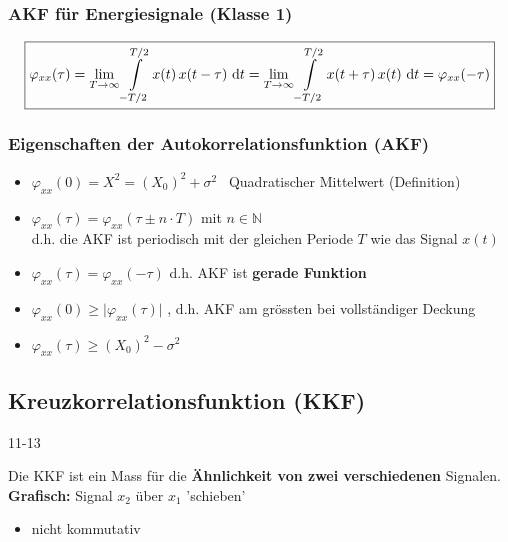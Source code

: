 \subsubsection{AKF für Energiesignale (Klasse 1)}

\vspace{-0.2cm}

$$ \boxed{ \varphi_{xx}(\tau) = \lim\limits_{T \to \infty}  \int\limits_{-T/2}^{T/2} x(t) \, x(t-\tau) \, \mathop{} \! \mathrm{d} t 
    =  \lim\limits_{T \to \infty}  \int\limits_{-T/2}^{T/2} x(t+\tau) \,x(t) \, \mathop{} \! \mathrm{d} t = \varphi_{xx}(-\tau) } $$


\subsubsection{Eigenschaften der Autokorrelationsfunktion (AKF)}

\begin{itemize}
    \setlength\itemsep{5pt}
    \item $\varphi_{xx}(0) = X^2 = (X_0)^2 + \sigma^2 $ \textrightarrow\ Quadratischer Mittelwert (Definition)
    \item $\varphi_{xx}(\tau) = \varphi_{xx}(\tau \pm n \cdot T)$ mit $n \in \mathbb{N}$ \\
        d.h. die AKF ist periodisch mit der gleichen Periode $T$ wie das Signal $x(t)$ 
    \item $\varphi_{xx}(\tau) = \varphi_{xx}(-\tau)$ d.h. AKF ist \textbf{gerade Funktion} 
    \item $\varphi_{xx}(0) \geq \vert \varphi_{xx}(\tau) \vert$ , d.h. AKF am grössten bei vollständiger Deckung
    \item $\varphi_{xx}(\tau) \geq (X_0)^2 - \sigma^2$ 
\end{itemize}


\subsection{Kreuzkorrelationsfunktion (KKF)}{11-13}

Die KKF ist ein Mass für die \textbf{Ähnlichkeit von zwei verschiedenen} Signalen. \\
\textbf{Grafisch:} Signal $x_2$ über $x_1$ 'schieben'

\begin{itemize}
    \item nicht kommutativ
\end{itemize}

\vspace{0.2cm}

